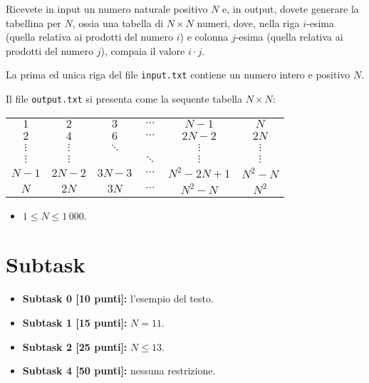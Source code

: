 \renewcommand{\nomebreve}{for2\_file}
\renewcommand{\titolo}{Esercizio sui for annidati - computo tabelline}

\introduzione{}

Ricevete in input un numero naturale positivo $N$ e,
in output, dovete generare la tabellina per $N$,
ossia una tabella di $N\times N$ numeri, dove,
nella riga $i$-esima (quella relativa ai prodotti del numero $i$)
e colonna $j$-esima  (quella relativa ai prodotti del numero $j$),
compaia il valore $i\cdot j$.

La prima ed unica riga del file \verb'input.txt' contiene un numero intero e positivo $N$.


Il file \verb'output.txt' si presenta come la sequente tabella $N\times N$:\\

\begin{tabular}{cccccc}
    $1$   &   $2$    &  $3$     & $\cdots$ &  $N-1$     &  $N$ \\
    $2$   &   $4$    &  $6$     & $\cdots$ & $2N-2$     & $2N$ \\
 $\vdots$ & $\vdots$ & $\ddots$ &          &   $\vdots$ &  $\vdots$ \\
 $\vdots$ & $\vdots$ &          & $\ddots$ &   $\vdots$ &  $\vdots$ \\
  $N-1$   & $2N-2$   & $3N-3$   & $\cdots$ & $N^2-2N+1$ & $N^2-N$ \\
    $N$   &  $2N$    & $3N$     & $\cdots$ &    $N^2-N$ &  $N^2$
\end{tabular}


\begin{itemize}[nolistsep, noitemsep]
  \item $1 \le N \le 1\,000$.
\end{itemize}
  
  \section*{Subtask}
  \begin{itemize}
    \item \textbf{Subtask 0 [10 punti]:} l'esempio del testo.
    \item \textbf{Subtask 1 [15 punti]:} $N = 11$.
    \item \textbf{Subtask 2 [25 punti]:} $N \leq 13$.
    \item \textbf{Subtask 4 [50 punti]:} nessuna restrizione.
  \end{itemize}
  
